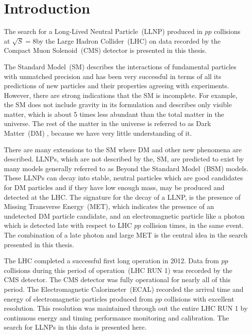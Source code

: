 \chapter{Introduction}
\par %
The search for a Long-Lived Neutral Particle~(LLNP) produced in $pp$ collisions at $\sqrt{S} = 8$\TeV by the Large Hadron Collider~(LHC) on data recorded by the Compact Muon Solenoid~(CMS) detector is presented in this thesis.
\par
The Standard Model~(SM) describes the interactions of fundamental particles with unmatched precision and has been very successful in terms of all its predictions of new particles and their properties  agreeing with experiments. However, there are strong indications that the SM is incomplete. For example, the SM does not include gravity in its formulation and describes only visible matter, which is
about 5 times less abundant than the total matter in the universe. The rest of the matter in the universe is referred to as Dark Matter~(DM) \cite{DM,SUSYDM,LSPDM}, because we have very little understanding of it.
\par
There are many extensions to the SM where DM and other new phenomena are described. LLNPs, which are not described by the, SM, are predicted to exist by many models generally referred to as Beyond the Standard Model~(BSM) models. These LLNPs can decay into stable, neutral particles which are good candidates for DM particles and if they have low enough mass, may be produced and detected at the LHC. The signature for the decay of a LLNP, is the presence of Missing Transverse Energy~(MET), which indicates the presence of an undetected  DM particle candidate, and an electromagnetic particle like a photon which is detected late with respect to LHC $pp$ collision times, in the same event. The combination of a late photon and large MET is the central idea in the search presented in this thesis.
\par
The LHC completed a successful first long operation in 2012. Data from $pp$ collisions during this period of operation~(LHC RUN 1) was recorded by the CMS detector. The CMS detector was fully operational for nearly all of this period. The Electromagnetic Calorimeter~(ECAL) recorded the arrival time and energy of electromagnetic particles produced from $pp$ collisions with excellent resolution. This resolution was maintained through out the entire LHC RUN 1 by continuous energy and timing performance monitoring and calibration. The search for LLNPs in this data is presented here.
